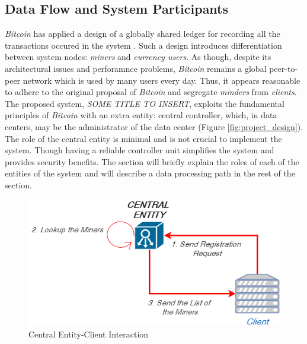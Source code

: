 \documentclass{article}
\newcommand{\projTitle}{SOME TITLE TO INSERT}
\begin{document}
\subsection{Data Flow and System Participants}
 \textit{Bitcoin} has applied a design of a globally shared ledger for recording all the transactions occured in the system \cite{bitcoin_paper}. Such a design introduces differentiation between system nodes: \textit{miners} and \textit{currency users}. As though, despite its architectural issues and perforamnce problems, \textit{Bitcoin} remains a global peer-to-peer network which is used by many users every day. Thus, it appears reasonable to adhere to the original proposal of \textit{Bitcoin} and segregate \textit{minders} from \textit{clients}. The proposed system, \textit{\projTitle}, exploits the fundamental principles of \textit{Bitcoin} with an extra entity: central controller, which, in data centers, may be the administrator of the data center (Figure \ref{fig:project_design}). The role of the central entity is minimal and is not crucial to implement the system. Though having a reliable controller unit simplifies the system and provides security benefits. The section will briefly explain the roles of each of the entities of the system and will describe a data processing path in the rest of the section.


\begin{figure}[h]
  \includegraphics[width=0.5\linewidth]{figures/central_entity_client_reg.png}
  \caption{Central Entity-Client Interaction}
  \label{fig:central_entity_client_reg}
\end{figure}   
\end{document}
